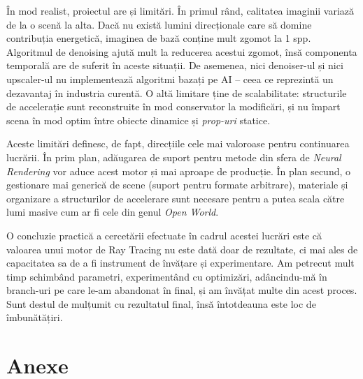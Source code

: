 \documentclass[12pt,a4paper]{report}
\numberwithin{equation}{section} %
\begin{document}
În mod realist, proiectul are și limitări.
În primul rând, calitatea imaginii variază de la o scenă la alta.
Dacă nu există lumini direcționale care să domine contribuția energetică, imaginea de bază conține mult zgomot la 1 spp.
Algoritmul de denoising ajută mult la reducerea acestui zgomot, însă componenta temporală are de suferit în aceste situații.
De asemenea, nici denoiser-ul și nici upscaler-ul nu implementează algoritmi bazați pe AI -- ceea ce reprezintă un dezavantaj în industria curentă.
O altă limitare ține de scalabilitate: structurile de accelerație sunt reconstruite în mod conservator la modificări, și nu împart scena în mod optim între obiecte dinamice și \textit{prop-uri} statice.

Aceste limitări definesc, de fapt, direcțiile cele mai valoroase pentru continuarea lucrării.
În prim plan, adăugarea de suport pentru metode din sfera de \textit{Neural Rendering} vor aduce acest motor și mai aproape de producție.
În plan secund, o gestionare mai generică de scene (suport pentru formate arbitrare), materiale și organizare a structurilor de accelerare sunt necesare pentru a putea scala către lumi masive cum ar fi cele din genul \textit{Open World}.

O concluzie practică a cercetării efectuate în cadrul acestei lucrări este că valoarea unui motor de Ray Tracing nu este dată doar de rezultate, ci mai ales de capacitatea sa de a fi instrument de învățare și experimentare.
Am petrecut mult timp schimbând parametri, experimentând cu optimizări, adâncindu-mă în branch-uri pe care le-am abandonat în final, și am învățat multe din acest proces.
Sunt destul de mulțumit cu rezultatul final, însă întotdeauna este loc de îmbunătățiri.





\chapter*{Anexe}
\end{document}
